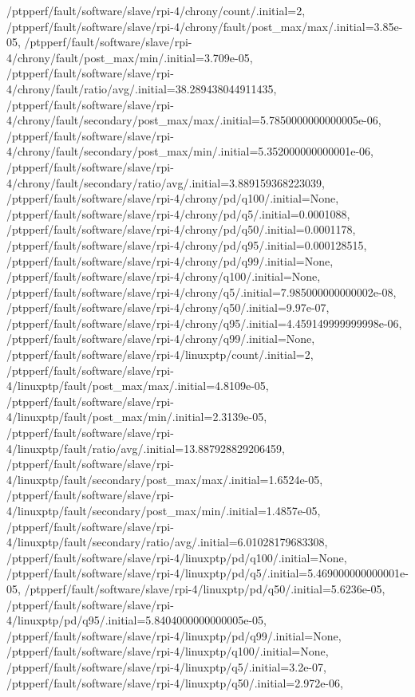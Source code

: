 {    /ptpperf/fault/software/slave/rpi-4/chrony/count/.initial=2,
    /ptpperf/fault/software/slave/rpi-4/chrony/fault/post_max/max/.initial=3.85e-05,
    /ptpperf/fault/software/slave/rpi-4/chrony/fault/post_max/min/.initial=3.709e-05,
    /ptpperf/fault/software/slave/rpi-4/chrony/fault/ratio/avg/.initial=38.289438044911435,
    /ptpperf/fault/software/slave/rpi-4/chrony/fault/secondary/post_max/max/.initial=5.7850000000000005e-06,
    /ptpperf/fault/software/slave/rpi-4/chrony/fault/secondary/post_max/min/.initial=5.352000000000001e-06,
    /ptpperf/fault/software/slave/rpi-4/chrony/fault/secondary/ratio/avg/.initial=3.889159368223039,
    /ptpperf/fault/software/slave/rpi-4/chrony/pd/q100/.initial=None,
    /ptpperf/fault/software/slave/rpi-4/chrony/pd/q5/.initial=0.0001088,
    /ptpperf/fault/software/slave/rpi-4/chrony/pd/q50/.initial=0.0001178,
    /ptpperf/fault/software/slave/rpi-4/chrony/pd/q95/.initial=0.000128515,
    /ptpperf/fault/software/slave/rpi-4/chrony/pd/q99/.initial=None,
    /ptpperf/fault/software/slave/rpi-4/chrony/q100/.initial=None,
    /ptpperf/fault/software/slave/rpi-4/chrony/q5/.initial=7.985000000000002e-08,
    /ptpperf/fault/software/slave/rpi-4/chrony/q50/.initial=9.97e-07,
    /ptpperf/fault/software/slave/rpi-4/chrony/q95/.initial=4.459149999999998e-06,
    /ptpperf/fault/software/slave/rpi-4/chrony/q99/.initial=None,
    /ptpperf/fault/software/slave/rpi-4/linuxptp/count/.initial=2,
    /ptpperf/fault/software/slave/rpi-4/linuxptp/fault/post_max/max/.initial=4.8109e-05,
    /ptpperf/fault/software/slave/rpi-4/linuxptp/fault/post_max/min/.initial=2.3139e-05,
    /ptpperf/fault/software/slave/rpi-4/linuxptp/fault/ratio/avg/.initial=13.887928829206459,
    /ptpperf/fault/software/slave/rpi-4/linuxptp/fault/secondary/post_max/max/.initial=1.6524e-05,
    /ptpperf/fault/software/slave/rpi-4/linuxptp/fault/secondary/post_max/min/.initial=1.4857e-05,
    /ptpperf/fault/software/slave/rpi-4/linuxptp/fault/secondary/ratio/avg/.initial=6.01028179683308,
    /ptpperf/fault/software/slave/rpi-4/linuxptp/pd/q100/.initial=None,
    /ptpperf/fault/software/slave/rpi-4/linuxptp/pd/q5/.initial=5.469000000000001e-05,
    /ptpperf/fault/software/slave/rpi-4/linuxptp/pd/q50/.initial=5.6236e-05,
    /ptpperf/fault/software/slave/rpi-4/linuxptp/pd/q95/.initial=5.8404000000000005e-05,
    /ptpperf/fault/software/slave/rpi-4/linuxptp/pd/q99/.initial=None,
    /ptpperf/fault/software/slave/rpi-4/linuxptp/q100/.initial=None,
    /ptpperf/fault/software/slave/rpi-4/linuxptp/q5/.initial=3.2e-07,
    /ptpperf/fault/software/slave/rpi-4/linuxptp/q50/.initial=2.972e-06,
}
